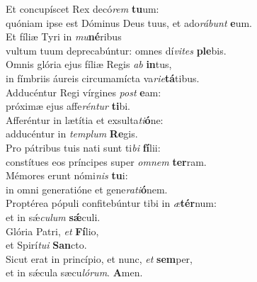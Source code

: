 \oddverse Et concupíscet Rex decó\textit{rem} \textbf{tu}um:~\*\\
\oddverse quóniam ipse est Dóminus Deus tuus, et ado\textit{rá}\textit{bunt} \textbf{e}um.\\
\evenverse Et fíliæ Tyri in \textit{mu}\textbf{né}ribus~\*\\
\evenverse vultum tuum deprecabúntur: omnes dí\textit{vi}\textit{tes} \textbf{ple}bis.\\
\oddverse Omnis glória ejus fíliæ Regis \textit{ab} \textbf{in}tus,~\*\\
\oddverse in fímbriis áureis circumamícta va\textit{ri}\textit{e}\textbf{tá}tibus.\\
\evenverse Adducéntur Regi vírgines \textit{post} \textbf{e}am:~\*\\
\evenverse próximæ ejus affe\textit{rén}\textit{tur} \textbf{ti}bi.\\
\oddverse Afferéntur in lætítia et exsulta\textit{ti}\textbf{ó}ne:~\*\\
\oddverse adducéntur in \textit{tem}\textit{plum} \textbf{Re}gis.\\
\evenverse Pro pátribus tuis nati sunt ti\textit{bi} \textbf{fí}lii:~\*\\
\evenverse constítues eos príncipes super \textit{om}\textit{nem} \textbf{ter}ram.\\
\oddverse Mémores erunt nómi\textit{nis} \textbf{tu}i:~\*\\
\oddverse in omni generatióne et gene\textit{ra}\textit{ti}\textbf{ó}nem.\\
\evenverse Proptérea pópuli confitebúntur tibi in \textit{æ}\textbf{tér}num:~\*\\
\evenverse et in sǽ\textit{cu}\textit{lum} \textbf{sǽ}culi.\\
\oddverse Glória Patri, \textit{et} \textbf{Fí}lio,~\*\\
\oddverse et Spirí\textit{tu}\textit{i} \textbf{San}cto.\\
\evenverse Sicut erat in princípio, et nunc, \textit{et} \textbf{sem}per,~\*\\
\evenverse et in sǽcula sæcu\textit{ló}\textit{rum}. \textbf{A}men.\\
